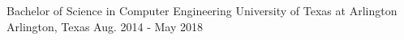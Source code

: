 


\begin{cventries}


\cventry
{Bachelor of Science in Computer Engineering} %
{University of Texas at Arlington} %
{Arlington, Texas} %
{Aug. 2014 - May 2018} %
{} %

\end{cventries}